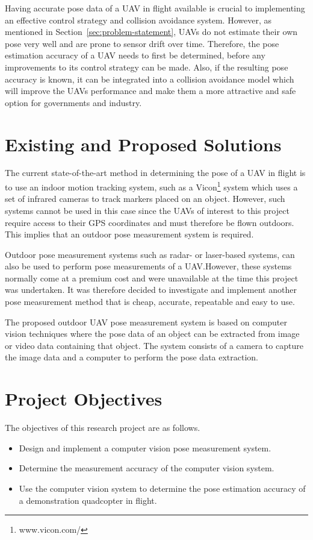 Having accurate pose data of a UAV in flight available is crucial to implementing an effective control strategy and collision avoidance system. However, as mentioned in Section~\ref{sec:problem-statement}, UAVs do not estimate their own pose very well and are prone to sensor drift over time. Therefore, the pose estimation accuracy of a UAV needs to first be determined, before any improvements to its control strategy can be made. Also, if the resulting pose accuracy is known, it can be integrated into a collision avoidance model which will improve the UAVs performance and make them a more attractive and safe option for governments and industry. 

\section{Existing and Proposed Solutions}

The current state-of-the-art method in determining the pose of a UAV in flight is to use an indoor motion tracking system, such as a Vicon\footnote{www.vicon.com/} system which uses a set of infrared cameras to track markers placed on an object. However, such systems cannot be used in this case since the UAVs of interest to this project require access to their GPS coordinates and must therefore be flown outdoors. This implies that an outdoor pose measurement system is required. 

Outdoor pose measurement systems such as radar- or laser-based systems, can also be used to perform pose measurements of a UAV.\@ However, these systems normally come at a premium cost and were unavailable at the time this project was undertaken. It was therefore decided to investigate and implement another pose measurement method that is cheap, accurate, repeatable and easy to use. 

The proposed outdoor UAV pose measurement system is based on computer vision techniques where the pose data of an object can be extracted from image or video data containing that object. The system consists of a camera to capture the image data and a computer to perform the pose data extraction. 

\section{Project Objectives}

The objectives of this research project are as follows. 

\begin{itemize}
  \item Design and implement a computer vision pose measurement system.
  \item Determine the measurement accuracy of the computer vision system.
  \item Use the computer vision system to determine the pose estimation accuracy of a demonstration quadcopter in flight. 
\end{itemize}

